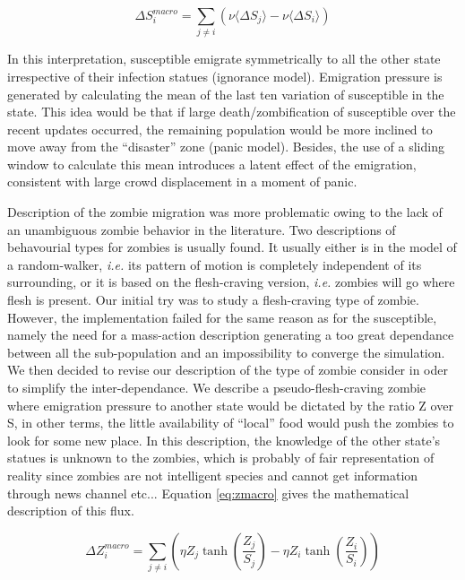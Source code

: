 \documentclass[11pt]{article} %
\begin{document}
\bigskip
\begin{equation} \label{eq:smacro}
\Delta S_{i}^{macro} =  \sum_{j\neq i}{ \left( \nu \langle \Delta S_{j} \rangle - \nu  \langle \Delta S_{i} \rangle \right) }
\end{equation}
\bigskip

In this interpretation, susceptible emigrate symmetrically to all the other state irrespective of their infection statues (ignorance model). Emigration pressure is generated by calculating the mean of the last ten variation of susceptible in the state. This idea would be that if large death/zombification of susceptible over the recent updates occurred, the remaining population would be more inclined to move away from the ``disaster'' zone (panic model). Besides, the use of a sliding window to calculate this mean introduces a latent effect of the emigration, consistent with large crowd displacement in a moment of panic. 

Description of the zombie migration was more problematic owing to the lack of an unambiguous zombie behavior in the literature. Two descriptions of behavourial types for zombies is usually found. It usually either is in the model of a random-walker, \textit{i.e.} its pattern of motion is completely independent of its surrounding, or it is based on the flesh-craving version, \textit{i.e.} zombies will go where flesh is present. Our initial try was to study a flesh-craving type of zombie. However, the implementation failed for the same reason as for the susceptible, namely the need for a mass-action description generating a too great dependance between all the sub-population and an impossibility to converge the simulation. We then decided to revise our description of the type of zombie consider in oder to simplify the inter-dependance. We describe a pseudo-flesh-craving zombie where emigration pressure to another state would be dictated by the ratio Z over S, in other terms, the little availability of ``local'' food would push the zombies to look for some new place. In this description, the knowledge of the other state's statues is unknown to the zombies, which is probably of fair representation of reality since zombies are not intelligent species and cannot get information through news channel etc... Equation \eqref{eq:zmacro} gives the mathematical description of this flux. 

\bigskip
\begin{equation} \label{eq:zmacro}
\Delta Z_{i}^{macro} = \sum_{j\neq i}{\left( \eta Z_{j}\tanh \left( \frac{Z_{j}}{S_{j}}\right) -\eta Z_{i}\tanh \left( \frac{Z_{i}}{S_{i}}\right) \right)}
\end{equation}
\bigskip
\end{document}
